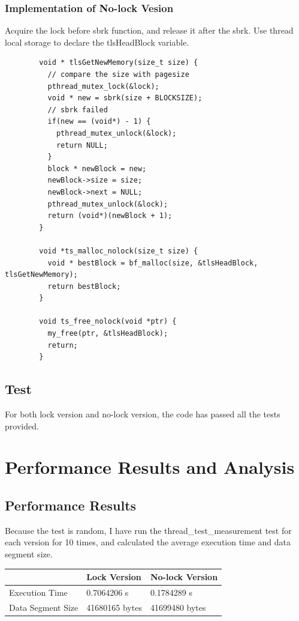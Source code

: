 \documentclass[a4paper,10pt]{article}
\begin{document}
      \subsubsection{Implementation of No-lock Vesion}
      \par Acquire the lock before sbrk function, and release it after the sbrk. Use thread
      local storage to declare the tlsHeadBlock variable.
      \begin{lstlisting}
        void * tlsGetNewMemory(size_t size) {
          // compare the size with pagesize
          pthread_mutex_lock(&lock);
          void * new = sbrk(size + BLOCKSIZE);
          // sbrk failed
          if(new == (void*) - 1) {
            pthread_mutex_unlock(&lock);
            return NULL;
          }
          block * newBlock = new;
          newBlock->size = size;
          newBlock->next = NULL;
          pthread_mutex_unlock(&lock);
          return (void*)(newBlock + 1);
        }

        void *ts_malloc_nolock(size_t size) {
          void * bestBlock = bf_malloc(size, &tlsHeadBlock, tlsGetNewMemory);
          return bestBlock;
        }

        void ts_free_nolock(void *ptr) {
          my_free(ptr, &tlsHeadBlock);
          return;
        }
      \end{lstlisting}

    \subsection{Test}
    \par For both lock version and no-lock version, the code has passed all the tests
    provided. 
    
    \section{Performance Results and Analysis}   
    \subsection{Performance Results}
    \par Because the test is random, 
    I have run the thread\_test\_measurement test for each version for 10 times, and
    calculated the average execution time and data segment size.
    \begin{table}[htb]
      \centering
      \begin{tabular}{|l|l|l|}
      \hline
                        & Lock Version   & No-lock Version \\ \hline
      Execution Time    & 0.7064206 s    & 0.1784289 s     \\ \hline
      Data Segment Size & 41680165 bytes & 41699480 bytes  \\ \hline
      \end{tabular}
    \end{table}
\end{document}
